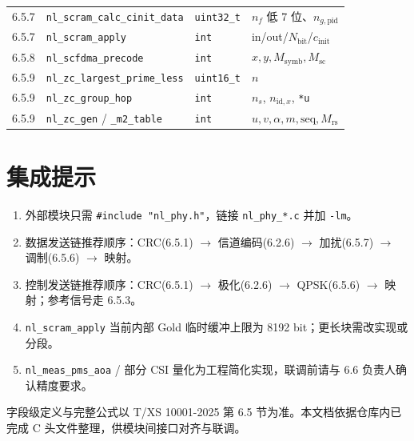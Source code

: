 \documentclass[11pt,a4paper]{ctexart}
\begin{document}
\begin{longtable}{@{}C{1.2cm}L{4.6cm}L{2.2cm}L{6.5cm}@{}}
6.5.7 & \texttt{nl\_scram\_calc\_cinit\_data} & \texttt{uint32\_t} & $n_f$ 低 7 位、$n_{g,\mathrm{pid}}$ \\
6.5.7 & \texttt{nl\_scram\_apply} & \texttt{int} & in/out/$N_{\mathrm{bit}}$/$c_{\mathrm{init}}$ \\
6.5.8 & \texttt{nl\_scfdma\_precode} & \texttt{int} & $x,y,M_{\mathrm{symb}},M_{\mathrm{sc}}$ \\
6.5.9 & \texttt{nl\_zc\_largest\_prime\_less} & \texttt{uint16\_t} & $n$ \\
6.5.9 & \texttt{nl\_zc\_group\_hop} & \texttt{int} & $n_s$, $n_{\mathrm{id},x}$, \texttt{*u} \\
6.5.9 & \texttt{nl\_zc\_gen} / \texttt{\_m2\_table} & \texttt{int} & $u,v,\alpha,m,\mathrm{seq},M_{\mathrm{rs}}$ \\
\bottomrule
\end{longtable}

\section{集成提示}

\begin{enumerate}[nosep]
  \item 外部模块只需 \texttt{\#include "nl\_phy.h"}，链接 \texttt{nl\_phy\_*.c} 并加 \texttt{-lm}。
  \item 数据发送链推荐顺序：CRC(6.5.1) $\rightarrow$ 信道编码(6.2.6) $\rightarrow$ 加扰(6.5.7) $\rightarrow$ 调制(6.5.6) $\rightarrow$ 映射。
  \item 控制发送链推荐顺序：CRC(6.5.1) $\rightarrow$ 极化(6.2.6) $\rightarrow$ QPSK(6.5.6) $\rightarrow$ 映射；参考信号走 6.5.3。
  \item \texttt{nl\_scram\_apply} 当前内部 Gold 临时缓冲上限为 8192 bit；更长块需改实现或分段。
  \item \texttt{nl\_meas\_pms\_aoa} / 部分 CSI 量化为工程简化实现，联调前请与 6.6 负责人确认精度要求。
\end{enumerate}

\vspace{1.5em}
{\small\color{gray}
字段级定义与完整公式以 T/XS 10001-2025 第 6.5 节为准。本文档依据仓库内已完成 C 头文件整理，供模块间接口对齐与联调。
}
\end{document}
